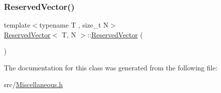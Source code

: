 \subsubsection{\texorpdfstring{Reserved\+Vector()}{ReservedVector()}}
{\footnotesize\ttfamily template$<$typename T , size\+\_\+t N$>$ \\
\hyperlink{class_reserved_vector}{Reserved\+Vector}$<$ T, N $>$\+::\hyperlink{class_reserved_vector}{Reserved\+Vector} (\begin{DoxyParamCaption}{ }\end{DoxyParamCaption})\hspace{0.3cm}{\ttfamily [inline]}}



The documentation for this class was generated from the following file\+:\begin{DoxyCompactItemize}
\item 
src/\hyperlink{_miscellaneous_8h}{Miscellaneous.\+h}\end{DoxyCompactItemize}
